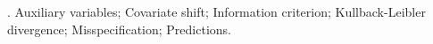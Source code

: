 \documentclass[12pt]{article}
\begin{document}
\vskip 2mm

.
Auxiliary variables; Covariate shift; Information criterion; Kullback-Leibler divergence; Misspecification; Predictions. 


%        
%
%        







\end{document}
